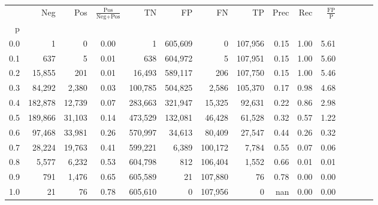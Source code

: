 \begin{tabular}{rrrcrrrrrrrrrrr}
\toprule
{} &      Neg &     Pos & $\frac{\text{Pos}}{\text{Neg}+\text{Pos}}$ &       TN &       FP &       FN &       TP &  Prec &   Rec & $\frac{\text{FP}}{\text{P}}$ \\
p   &          &         &                                            &          &          &          &          &       &       &                              \\
\midrule
0.0 &        1 &       0 &                                       0.00 &        1 &  605,609 &        0 &  107,956 &  0.15 &  1.00 &                         5.61 \\
0.1 &      637 &       5 &                                       0.01 &      638 &  604,972 &        5 &  107,951 &  0.15 &  1.00 &                         5.60 \\
0.2 &   15,855 &     201 &                                       0.01 &   16,493 &  589,117 &      206 &  107,750 &  0.15 &  1.00 &                         5.46 \\
0.3 &   84,292 &   2,380 &                                       0.03 &  100,785 &  504,825 &    2,586 &  105,370 &  0.17 &  0.98 &                         4.68 \\
0.4 &  182,878 &  12,739 &                                       0.07 &  283,663 &  321,947 &   15,325 &   92,631 &  0.22 &  0.86 &                         2.98 \\
0.5 &  189,866 &  31,103 &                                       0.14 &  473,529 &  132,081 &   46,428 &   61,528 &  0.32 &  0.57 &                         1.22 \\
0.6 &   97,468 &  33,981 &                                       0.26 &  570,997 &   34,613 &   80,409 &   27,547 &  0.44 &  0.26 &                         0.32 \\
0.7 &   28,224 &  19,763 &                                       0.41 &  599,221 &    6,389 &  100,172 &    7,784 &  0.55 &  0.07 &                         0.06 \\
0.8 &    5,577 &   6,232 &                                       0.53 &  604,798 &      812 &  106,404 &    1,552 &  0.66 &  0.01 &                         0.01 \\
0.9 &      791 &   1,476 &                                       0.65 &  605,589 &       21 &  107,880 &       76 &  0.78 &  0.00 &                         0.00 \\
1.0 &       21 &      76 &                                       0.78 &  605,610 &        0 &  107,956 &        0 &   nan &  0.00 &                         0.00 \\
\bottomrule
\end{tabular}
